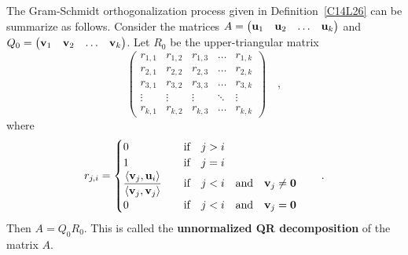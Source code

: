 The Gram-Schmidt orthogonalization process given in
Definition~\ref{C14L26} can be summarize as follows.
Consider the  matrices
$A = \begin{pmatrix} \mathbf{u}_1 & \mathbf{u}_2 & \ldots & \mathbf{u}_k\end{pmatrix}$
and
$Q_0 = \begin{pmatrix} \mathbf{v}_1 & \mathbf{v}_2 & \ldots & \mathbf{v}_k\end{pmatrix}$.
Let $R_0$ be the  upper-triangular matrix
\[
\begin{pmatrix}
r_{1,1} & r_{1,2} & r_{1,3} & \ldots & r_{1,k} \\
r_{2,1} & r_{2,2} & r_{2,3} & \ldots & r_{2,k} \\
r_{3,1} & r_{3,2} & r_{3,3} & \ldots & r_{3,k} \\
\vdots & \vdots & \vdots & \ddots & \vdots \\
r_{k,1} & r_{k,2} & r_{k,3} & \ldots & r_{k,k}
\end{pmatrix} \quad ,
\]
where
\[
r_{j,i} = \begin{cases}
0 & \quad \text{if} \quad j > i \\    
1 & \quad \text{if} \quad j = i \\    
\displaystyle \frac{\left\langle{\mathbf{v}_j} , {\mathbf{u}_i}\right\rangle}{\left\langle{\mathbf{v}_j} , {\mathbf{v}_j}\right\rangle}
& \quad \text{if} \quad j < i \quad \text{and} \quad
\mathbf{v}_j \neq \mathbf{0} \\
0 & \quad \text{if} \quad j < i \quad \text{and} \quad
\mathbf{v}_j = \mathbf{0}
\end{cases} \qquad .
\]  
Then $A = Q_0 R_0$.  This is called the
{\bfseries unnormalized QR decomposition} of the matrix $A$. 

